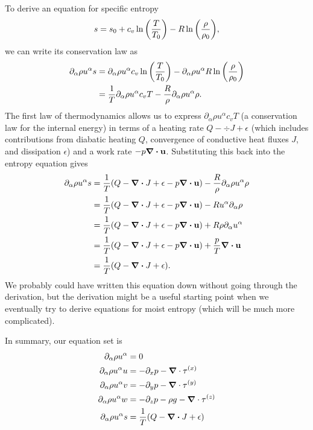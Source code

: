 \documentclass[11pt]{article}
\begin{document}
To derive an equation for specific entropy
\begin{align*}
s = s_0 + c_v \ln \qty(\frac{T}{T_0}) - R \ln \qty(\frac{\rho}{\rho_0}),
\end{align*}
we can write its conservation law as
\begin{align*}
\partial_{\alpha} \rho u^{\alpha} s &= \partial_{\alpha} \rho u^{\alpha} c_v \ln \qty(\frac{T}{T_0}) - \partial_\alpha \rho u^{\alpha} R \ln \qty(\frac{\rho}{\rho_0}) \\
&= \frac{1}{T} \partial_{\alpha} \rho u^{\alpha} c_v T - \frac{R}{\rho} \partial_{\alpha} \rho u^{\alpha} \rho.
\end{align*}
The first law of thermodynamics allows us to express $\partial_{\alpha} \rho u^{\alpha} c_v T$ (a conservation law for the internal energy) in terms of a heating rate $Q - \div J + \epsilon$ (which includes contributions from diabatic heating $Q$, convergence of conductive heat fluxes $J$, and dissipation $\epsilon$) and a work rate $-p \div {\bf u}$. Substituting this back into the entropy equation gives
\begin{align*}
\partial_{\alpha} \rho u^{\alpha} s &= \frac{1}{T} \qty(Q - \div J + \epsilon - p \div {\bf u}) - \frac{R}{\rho} \partial_{\alpha} \rho u^{\alpha} \rho \\
&= \frac{1}{T} \qty(Q - \div J + \epsilon - p \div {\bf u}) - R u^{\alpha} \partial_{\alpha} \rho \\
&= \frac{1}{T} \qty(Q - \div J + \epsilon - p \div {\bf u}) + R \rho \partial_{\alpha} u^{\alpha} \\
&= \frac{1}{T} \qty(Q - \div J + \epsilon - p \div {\bf u}) + \frac{p}{T} \div {\bf u} \\
&= \frac{1}{T} \qty(Q - \div J + \epsilon).
\end{align*}
We probably could have written this equation down without going through the derivation, but the derivation might be a useful starting point when we eventually try to derive equations for moist entropy (which will be much more complicated).

In summary, our equation set is
\begin{align}
\partial_\alpha \rho u^{\alpha} &= 0 \\
\partial_{\alpha} \rho u^{\alpha} u &= -\partial_x p - \grad \cdot {\bf \tau}^{(x)} \\
\partial_{\alpha} \rho u^{\alpha} v &= -\partial_y p - \grad \cdot {\bf \tau}^{(y)} \\
\partial_{\alpha} \rho u^{\alpha} w &= -\partial_z p - \rho g - \grad \cdot {\bf \tau}^{(z)} \\
\partial_{\alpha} \rho u^{\alpha} s &= \frac{1}{T} \qty(Q - \div J + \epsilon)
\end{align}
\end{document}
